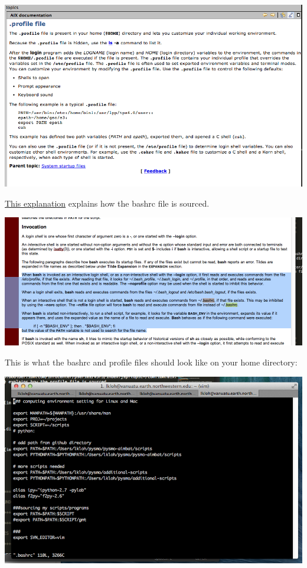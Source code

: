 \documentclass[letterpaper,10pt,english]{sphinxmanual}
\begin{document}
\includegraphics{profile_file.png}

\href{http://linux.die.net/man/1/bash}{This explanation} explains how the bashrc file is sourced.

\includegraphics{bashrc_file.png}

This is what the bashrc and profile files should look like on your home directory:

\includegraphics{bashrc_home.png}
\end{document}
